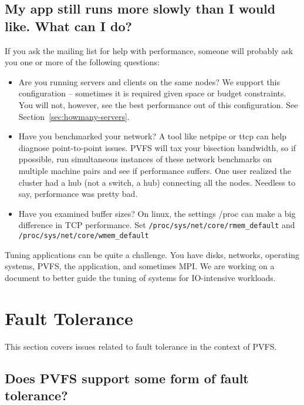 \documentclass[11pt,letterpaper]{article}
\begin{document}
\subsection{My app still runs more slowly than I would like.  What can I do?}
\label{sec:tuning}

If you ask the mailing list for help with performance, someone will probably
ask you one or more of the following questions:

\begin{itemize}

\item Are you running servers and clients on the same nodes?  We support this
      configuration -- sometimes it is required given space or budget
      constraints.  You will not, however, see the best performance out of this
      configuration.  See Section~\ref{sec:howmany-servers}. 

\item Have you benchmarked your network?  A tool like netpipe or ttcp can help
      diagnose point-to-point issues.  PVFS will tax your bisection bandwidth,
      so if ppossible, run simultaneous instances of these network benchmarks
      on multiple machine pairs and see if performance suffers.  One user
      realized the cluster had a hub (not a switch, a hub) connecting all the
      nodes.  Needless to say, performance was pretty bad. 

\item Have you examined buffer sizes?  On linux, the settings /proc can make a
      big difference in TCP performance.  Set
      \texttt{/proc/sys/net/core/rmem\_default} and
      \texttt{/proc/sys/net/core/wmem\_default} 

\end{itemize}

Tuning applications can be quite a challenge.  You have disks, networks,
operating systems, PVFS, the application, and sometimes MPI.  We are
working on a document to better guide the tuning of systems for
IO-intensive workloads.


%
%
\section{Fault Tolerance}
\label{sec:fault-tolerance}

This section covers issues related to fault tolerance in the context of PVFS.

\subsection{Does PVFS support some form of fault tolerance?}
\end{document}

